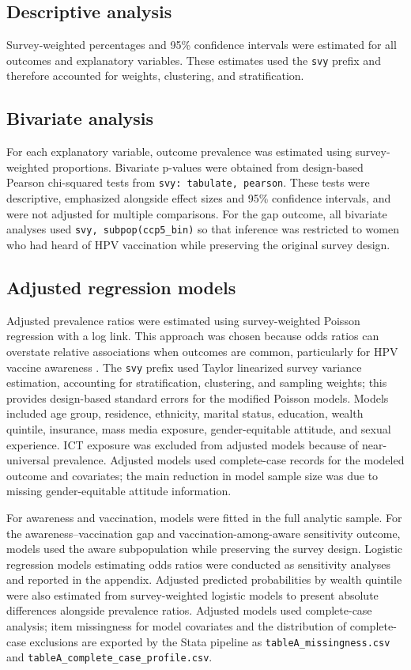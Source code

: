\subsection{Descriptive analysis}

Survey-weighted percentages and 95\% confidence intervals were estimated for all outcomes and explanatory variables. These estimates used the \texttt{svy} prefix and therefore accounted for weights, clustering, and stratification.

\subsection{Bivariate analysis}

For each explanatory variable, outcome prevalence was estimated using survey-weighted proportions. Bivariate p-values were obtained from design-based Pearson chi-squared tests from \texttt{svy: tabulate, pearson}. These tests were descriptive, emphasized alongside effect sizes and 95\% confidence intervals, and were not adjusted for multiple comparisons. For the gap outcome, all bivariate analyses used \texttt{svy, subpop(ccp5\_bin)} so that inference was restricted to women who had heard of HPV vaccination while preserving the original survey design.

\subsection{Adjusted regression models}

Adjusted prevalence ratios were estimated using survey-weighted Poisson regression with a log link. This approach was chosen because odds ratios can overstate relative associations when outcomes are common, particularly for HPV vaccine awareness \cite{barros2003,zou2004}. The \texttt{svy} prefix used Taylor linearized survey variance estimation, accounting for stratification, clustering, and sampling weights; this provides design-based standard errors for the modified Poisson models. Models included age group, residence, ethnicity, marital status, education, wealth quintile, insurance, mass media exposure, gender-equitable attitude, and sexual experience. ICT exposure was excluded from adjusted models because of near-universal prevalence. Adjusted models used complete-case records for the modeled outcome and covariates; the main reduction in model sample size was due to missing gender-equitable attitude information.

For awareness and vaccination, models were fitted in the full analytic sample. For the awareness--vaccination gap and vaccination-among-aware sensitivity outcome, models used the aware subpopulation while preserving the survey design. Logistic regression models estimating odds ratios were conducted as sensitivity analyses and reported in the appendix. Adjusted predicted probabilities by wealth quintile were also estimated from survey-weighted logistic models to present absolute differences alongside prevalence ratios. Adjusted models used complete-case analysis; item missingness for model covariates and the distribution of complete-case exclusions are exported by the Stata pipeline as \texttt{tableA\_missingness.csv} and \texttt{tableA\_complete\_case\_profile.csv}.


